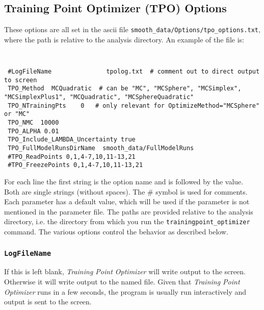 \documentclass[UserManual.tex]{subfiles}
\begin{document}
\subsection{Training Point Optimizer (TPO) Options}
These options are all set in the ascii file {\tt smooth\_data/Options/tpo\_options.txt}, where the path is relative to the analysis directory. An example of the file is:
{\tt
\begin{verbatim}
 #LogFileName               tpolog.txt  # comment out to direct output to screen
 TPO_Method  MCQuadratic  # can be "MC", "MCSphere", "MCSimplex", "MCSimplexPlus1", "MCQuadratic", "MCSphereQuadratic"
 TPO_NTrainingPts    0   # only relevant for OptimizeMethod="MCSphere" or "MC"
 TPO_NMC  10000
 TPO_ALPHA 0.01
 TPO_Include_LAMBDA_Uncertainty true
 TPO_FullModelRunsDirName  smooth_data/FullModelRuns
 #TPO_ReadPoints 0,1,4-7,10,11-13,21
 #TPO_FreezePoints 0,1,4-7,10,11-13,21
\end{verbatim}
}
For each line the first string is the option name and is followed by the value. Both are single strings (without spaces). The \# symbol is used for comments. Each parameter has a default value, which will be used if the parameter is not mentioned in the parameter file.  The paths are provided relative to the analysis directory, i.e. the directory from which you run the {\tt trainingpoint\_optimizer} command. The various options control the behavior as described below.

\subsubsection{{\tt LogFileName}}
If this is left blank, {\it Training Point Optimizer} will write output to the screen. Otherwise it will write output to the named file. Given that {\it Training Point Optimizer} runs in a few seconds, the program is usually run interactively and output is sent to the screen.
\end{document}
